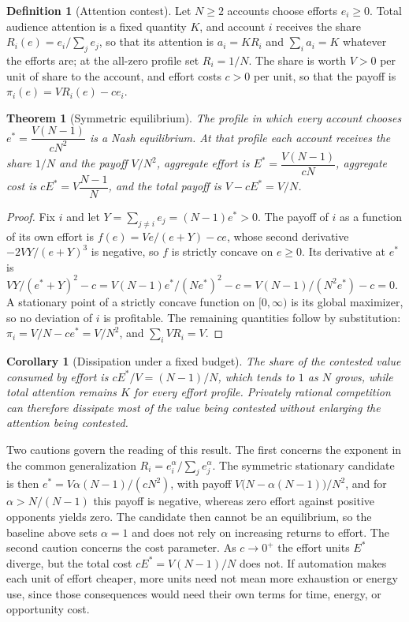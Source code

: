 \documentclass[12pt]{article}
\theoremstyle{plain}
\newtheorem{theorem}{Theorem}
\newtheorem{corollary}{Corollary}
\theoremstyle{definition}
\newtheorem{definition}{Definition}
\begin{document}
\begin{definition}[Attention contest]
Let $N\ge2$ accounts choose efforts $e_i\ge0$. Total audience attention is a fixed quantity $K$, and account $i$ receives the share $R_i(e)=e_i/\sum_{j}e_j$, so that its attention is $a_i=KR_i$ and $\sum_i a_i=K$ whatever the efforts are; at the all-zero profile set $R_i=1/N$. The share is worth $V>0$ per unit of share to the account, and effort costs $c>0$ per unit, so that the payoff is $\pi_i(e)=VR_i(e)-ce_i$.
\end{definition}

\begin{theorem}[Symmetric equilibrium]
The profile in which every account chooses $e^*=\dfrac{V(N-1)}{cN^2}$ is a Nash equilibrium. At that profile each account receives the share $1/N$ and the payoff $V/N^2$, aggregate effort is $E^*=\dfrac{V(N-1)}{cN}$, aggregate cost is $cE^*=V\dfrac{N-1}{N}$, and the total payoff is $V-cE^*=V/N$.
\end{theorem}

\begin{proof}
Fix $i$ and let $Y=\sum_{j\ne i}e_j=(N-1)e^*>0$. The payoff of $i$ as a function of its own effort is $f(e)=Ve/(e+Y)-ce$, whose second derivative $-2VY/(e+Y)^3$ is negative, so $f$ is strictly concave on $e\ge0$. Its derivative at $e^*$ is $VY/(e^*+Y)^2-c=V(N-1)e^*/(Ne^*)^2-c=V(N-1)/(N^2e^*)-c=0$. A stationary point of a strictly concave function on $[0,\infty)$ is its global maximizer, so no deviation of $i$ is profitable. The remaining quantities follow by substitution: $\pi_i=V/N-ce^*=V/N^2$, and $\sum_i VR_i=V$.
\end{proof}

\begin{corollary}[Dissipation under a fixed budget]
The share of the contested value consumed by effort is $cE^*/V=(N-1)/N$, which tends to $1$ as $N$ grows, while total attention remains $K$ for every effort profile. Privately rational competition can therefore dissipate most of the value being contested without enlarging the attention being contested.
\end{corollary}

Two cautions govern the reading of this result. The first concerns the exponent in the common generalization $R_i=e_i^{\alpha}/\sum_j e_j^{\alpha}$. The symmetric stationary candidate is then $e^*=V\alpha(N-1)/(cN^2)$, with payoff $V\bigl(N-\alpha(N-1)\bigr)/N^2$, and for $\alpha>N/(N-1)$ this payoff is negative, whereas zero effort against positive opponents yields zero. The candidate then cannot be an equilibrium, so the baseline above sets $\alpha=1$ and does not rely on increasing returns to effort. The second caution concerns the cost parameter. As $c\to0^+$ the effort units $E^*$ diverge, but the total cost $cE^*=V(N-1)/N$ does not. If automation makes each unit of effort cheaper, more units need not mean more exhaustion or energy use, since those consequences would need their own terms for time, energy, or opportunity cost.
\end{document}
